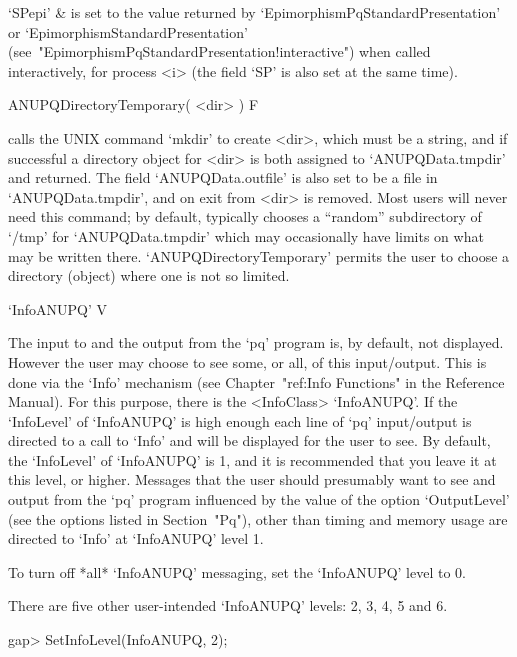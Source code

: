 \quad`SPepi'    &    is    set    to    the     value     returned     by
`EpimorphismPqStandardPresentation' or  `EpimorphismStandardPresentation'
(see~"EpimorphismPqStandardPresentation!interactive")     when     called
interactively, for process <i> (the field `SP' is also set  at  the  same
time).

\enditems

\>ANUPQDirectoryTemporary( <dir> ) F

calls the UNIX command `mkdir' to create <dir>, which must be  a  string,
and if successful a directory  object  for  <dir>  is  both  assigned  to
`ANUPQData.tmpdir' and returned. The field  `ANUPQData.outfile'  is  also
set to be a file in `ANUPQData.tmpdir', and on exit from {\GAP} <dir>  is
removed. Most users will never need  this  command;  by  default,  {\GAP}
typically   chooses   a   ``random''   subdirectory   of    `/tmp'    for
`ANUPQData.tmpdir' which may occasionally have  limits  on  what  may  be
written there. `ANUPQDirectoryTemporary' permits the  user  to  choose  a
directory (object) where one is not so limited.


\>`InfoANUPQ' V

The input to and the output from the `pq' program  is,  by  default,  not
displayed. However the user may choose to  see  some,  or  all,  of  this
input/output.   This   is   done   via   the   `Info'   mechanism    (see
Chapter~"ref:Info Functions" in the {\GAP} Reference  Manual).  For  this
purpose, there is the <InfoClass>  `InfoANUPQ'.  If  the  `InfoLevel'  of
`InfoANUPQ' is high enough each line of `pq' input/output is directed  to
a call to `Info' and will be displayed for the user to see.  By  default,
the `InfoLevel' of `InfoANUPQ' is 1, and it is recommended that you leave
it at this level, or higher. Messages that  the  user  should  presumably
want to see and output from the `pq' program influenced by the  value  of
the option `OutputLevel' (see the options listed in Section~"Pq"),  other
than timing and memory usage are directed to `Info' at `InfoANUPQ'  level
1.

To turn off *all* `InfoANUPQ' messaging, set the `InfoANUPQ' level to 0.

There are five other user-intended `InfoANUPQ' levels: 2, 3, 4, 5 and 6.

\beginexample
gap> SetInfoLevel(InfoANUPQ, 2);
\endexample

